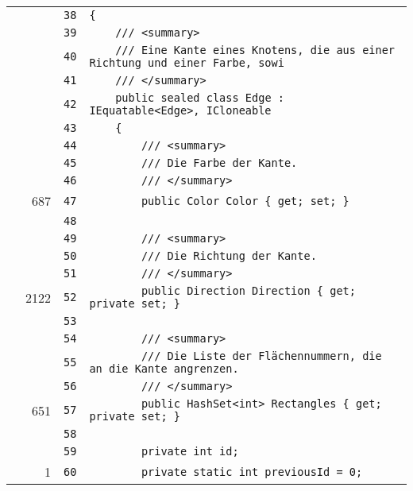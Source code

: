 \documentclass[a4paper,10pt]{article}
\begin{document}
\begin{longtable}[l]{lrrl}
\cellcolor{gray} &  & \verb~38~ & \verb~{~\\
\cellcolor{gray} &  & \verb~39~ & \verb~    /// <summary>~\\
\cellcolor{gray} &  & \verb~40~ & \verb~    /// Eine Kante eines Knotens, die aus einer Richtung und einer Farbe, sowi~\\
\cellcolor{gray} &  & \verb~41~ & \verb~    /// </summary>~\\
\cellcolor{gray} &  & \verb~42~ & \verb~    public sealed class Edge : IEquatable<Edge>, ICloneable~\\
\cellcolor{gray} &  & \verb~43~ & \verb~    {~\\
\cellcolor{gray} &  & \verb~44~ & \verb~        /// <summary>~\\
\cellcolor{gray} &  & \verb~45~ & \verb~        /// Die Farbe der Kante.~\\
\cellcolor{gray} &  & \verb~46~ & \verb~        /// </summary>~\\
\cellcolor{green} & 687 & \verb~47~ & \verb~        public Color Color { get; set; }~\\
\cellcolor{gray} &  & \verb~48~ & \verb~~\\
\cellcolor{gray} &  & \verb~49~ & \verb~        /// <summary>~\\
\cellcolor{gray} &  & \verb~50~ & \verb~        /// Die Richtung der Kante.~\\
\cellcolor{gray} &  & \verb~51~ & \verb~        /// </summary>~\\
\cellcolor{green} & 2122 & \verb~52~ & \verb~        public Direction Direction { get; private set; }~\\
\cellcolor{gray} &  & \verb~53~ & \verb~~\\
\cellcolor{gray} &  & \verb~54~ & \verb~        /// <summary>~\\
\cellcolor{gray} &  & \verb~55~ & \verb~        /// Die Liste der Flächennummern, die an die Kante angrenzen.~\\
\cellcolor{gray} &  & \verb~56~ & \verb~        /// </summary>~\\
\cellcolor{green} & 651 & \verb~57~ & \verb~        public HashSet<int> Rectangles { get; private set; }~\\
\cellcolor{gray} &  & \verb~58~ & \verb~~\\
\cellcolor{gray} &  & \verb~59~ & \verb~        private int id;~\\
\cellcolor{green} & 1 & \verb~60~ & \verb~        private static int previousId = 0;~\\

\end{longtable}
\end{document}
